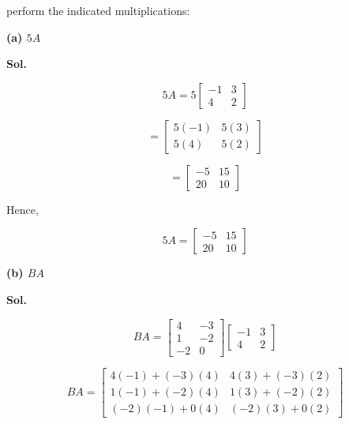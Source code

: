 \documentclass[12pt]{article}
\begin{document}
\noindent
perform the indicated multiplications:

\vspace{0.3cm}

\noindent
\textbf{(a) \(5A\)}

\vspace{0.5cm}

\noindent
\textbf{Sol.}

\vspace{0.3cm}


\[
5A
=
5
\begin{bmatrix}
-1 & 3\\
4 & 2
\end{bmatrix}
\]

\[
=
\begin{bmatrix}
5(-1) & 5(3)\\
5(4) & 5(2)
\end{bmatrix}
\]

\[
=
\begin{bmatrix}
-5 & 15\\
20 & 10
\end{bmatrix}
\]

\noindent
Hence,

\[
\boxed{
5A=
\begin{bmatrix}
-5 & 15\\
20 & 10
\end{bmatrix}
}
\]

\vspace{1cm}

\noindent
\textbf{(b) \(BA\)}

\vspace{0.5cm}

\noindent
\textbf{Sol.}

\vspace{0.3cm}

\[
BA
=
\begin{bmatrix}
4 & -3\\
1 & -2\\
-2 & 0
\end{bmatrix}
\begin{bmatrix}
-1 & 3\\
4 & 2
\end{bmatrix}
\]

\[
BA
=
\begin{bmatrix}
4(-1)+(-3)(4) & 4(3)+(-3)(2)\\
1(-1)+(-2)(4) & 1(3)+(-2)(2)\\
(-2)(-1)+0(4) & (-2)(3)+0(2)
\end{bmatrix}
\]
\end{document}
